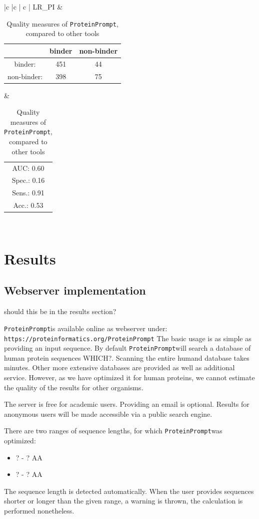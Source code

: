 \documentclass[preprint,3p,times,twocolumn]{elsarticle}
\newcommand{\TODO}[1] {\begingroup\color{red}#1\endgroup}
\newcommand{\url}[1]{\texttt{https://\small #1}}
\newcommand{\tool}{\texttt{ProteinPrompt}\hspace{2pt}}
\newcommand{\website}{\url{proteinformatics.org/\tool}}
\begin{document}
\begin{table}
\begin{tabular}{|c |c | c |}
  \hline
  LR\_PI  & \begin{tabular}{|c|c|c|} \firsthline  &  binder & non-binder \\ \hline binder: & 451 & 44 \\ \hline non-binder: & 398 & 75 \\ \hline \end{tabular} & \begin{tabular}{c} AUC: 0.60 \\ Spec.: 0.16 \\ Sens.: 0.91 \\ Acc.: 0.53 \end{tabular} \\
  \hline
\end{tabular}
\caption{ Quality measures of \tool, compared to other tools}
\label{tbl:all}
\end{table}
\endgroup


\section{Results}

\subsection{Webserver implementation}
\TODO{should this be in the results section?}

\tool is available online as webserver under: \website
The basic usage is as simple as providing an input sequence.
By default \tool will search a database of human protein sequences \TODO{WHICH?}.
Scanning the entire humand database takes minutes.
Other more extensive databases are provided as well as additional service.
However, as we have optimized it for human proteins, we cannot estimate the quality of the results for other organisms. 

The server is free for academic users.
Providing an email is optional.
Results for anonymous users will be made accessible via a public search engine.

There are two ranges of sequence lengths, for which \tool was optimized:
\begin{itemize}
\item \TODO{? - ?} AA
\item \TODO{? - ?} AA
\end{itemize}

The sequence length is detected automatically. When the user provides sequences shorter or longer than the given range, a warning is thrown, the calculation is performed nonetheless.
\end{document}
